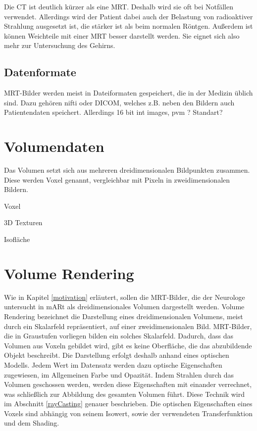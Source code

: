 Die CT ist deutlich kürzer als eine MRT. Deshalb wird sie oft bei Notfällen verwendet. Allerdings wird der Patient dabei auch der Belastung von radioaktiver Strahlung ausgesetzt ist, die stärker ist als beim normalen Röntgen. Außerdem ist können Weichteile mit einer MRT besser darstellt werden. Sie eignet sich also mehr zur Untersuchung des Gehirns.


\subsection{Datenformate}

MRT-Bilder werden meist in Dateiformaten gespeichert, die in der Medizin üblich sind. Dazu gehören nifti oder DICOM, welches z.B. neben den Bildern auch Patientendaten speichert.
Allerdings 
16 bit int images, pvm ? Standart?

\section{Volumendaten}							  %

Das Volumen setzt sich aus mehreren dreidimensionalen Bildpunkten zusammen. Diese werden Voxel genannt, vergleichbar mit Pixeln in zweidimensionalen Bildern.

Voxel

3D Texturen

Isofläche

\section{Volume Rendering}							  %
Wie in Kapitel \ref{motivation} erläutert, sollen die MRT-Bilder, die der Neurologe untersucht in mARt als dreidimensionales Volumen dargestellt werden. Volume Rendering bezeichnet die Darstellung eines dreidimensionalen Volumens, meist durch ein Skalarfeld repräsentiert, auf einer zweidimensionalen Bild. MRT-Bilder, die in Graustufen vorliegen bilden ein solches Skalarfeld. 
Dadurch, dass das Volumen aus Voxeln gebildet wird, gibt es keine Oberfläche, die das abzubildende Objekt beschreibt. Die Darstellung erfolgt deshalb anhand eines optischen Modells. Jedem Wert im Datensatz werden dazu optische Eigenschaften zugewiesen, im Allgemeinen Farbe und Opazität. Indem Strahlen durch das Volumen geschossen werden, werden diese Eigenschaften mit einander verrechnet, was schließlich zur Abbildung des gesamten Volumen führt. Diese Technik wird im Abschnitt \ref{rayCasting} genauer beschrieben.
Die optischen Eigenschaften eines Voxels sind abhängig von seinem Isowert, sowie der verwendeten Transferfunktion und dem Shading. 


